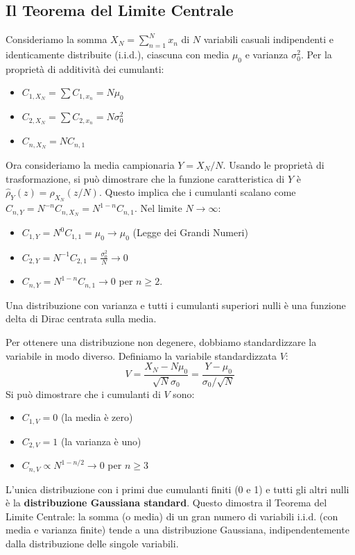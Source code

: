 \subsection{Il Teorema del Limite Centrale}

Consideriamo la somma $X_N = \sum_{n=1}^N x_n$ di $N$ variabili casuali indipendenti e identicamente distribuite (i.i.d.), ciascuna con media $\mu_0$ e varianza $\sigma_0^2$. Per la proprietà di additività dei cumulanti:
\begin{itemize}
    \item $C_{1,X_N} = \sum C_{1,x_n} = N\mu_0$
    \item $C_{2,X_N} = \sum C_{2,x_n} = N\sigma_0^2$
    \item $C_{n,X_N} = N C_{n,1}$
\end{itemize}
Ora consideriamo la media campionaria $Y = X_N/N$. Usando le proprietà di trasformazione, si può dimostrare che la funzione caratteristica di $Y$ è $\hat{\rho}_Y(z) = \hat{\rho}_{X_N}(z/N)$. Questo implica che i cumulanti scalano come $C_{n,Y} = N^{-n}C_{n,X_N} = N^{1-n}C_{n,1}$.
Nel limite $N \to \infty$:
\begin{itemize}
    \item $C_{1,Y} = N^0 C_{1,1} = \mu_0 \to \mu_0$ (Legge dei Grandi Numeri)
    \item $C_{2,Y} = N^{-1} C_{2,1} = \frac{\sigma_0^2}{N} \to 0$
    \item $C_{n,Y} = N^{1-n} C_{n,1} \to 0$ per $n \ge 2$.
\end{itemize}
Una distribuzione con varianza e tutti i cumulanti superiori nulli è una funzione delta di Dirac centrata sulla media.

Per ottenere una distribuzione non degenere, dobbiamo standardizzare la variabile in modo diverso. Definiamo la variabile standardizzata $V$:
\begin{equation}
V = \frac{X_N - N\mu_0}{\sqrt{N}\sigma_0} = \frac{Y - \mu_0}{\sigma_0/\sqrt{N}}
\end{equation}
Si può dimostrare che i cumulanti di $V$ sono:
\begin{itemize}
    \item $C_{1,V} = 0$ (la media è zero)
    \item $C_{2,V} = 1$ (la varianza è uno)
    \item $C_{n,V} \propto N^{1-n/2} \to 0$ per $n \ge 3$
\end{itemize}
L'unica distribuzione con i primi due cumulanti finiti (0 e 1) e tutti gli altri nulli è la \textbf{distribuzione Gaussiana standard}. Questo dimostra il Teorema del Limite Centrale: la somma (o media) di un gran numero di variabili i.i.d. (con media e varianza finite) tende a una distribuzione Gaussiana, indipendentemente dalla distribuzione delle singole variabili.

